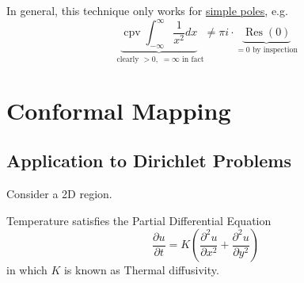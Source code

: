 \documentclass[12pt,titlepage]{article}
\DeclareMathOperator\Res{Res}
\DeclareMathOperator\cpv{cpv}
\let\stdsection\section
\renewcommand\section{\clearpage\stdsection}
\begin{document}
In general, this technique only works for \underline{simple poles}, e.g. $$\underbrace{\cpv \int_{-\infty}^{\infty}\dfrac{1}{x^2}dx}_{\text{ clearly }>0, \; = \infty \text{ in fact}} \neq \pi i \cdot \underbrace{\Res(0)}_{=0 \text{ by inspection}}$$
\section{Conformal Mapping}
\subsection{Application to Dirichlet Problems}
Consider a 2D region. \begin{center}
\end{center}
Temperature satisfies the Partial Differential Equation $$\dfrac{\partial u}{\partial t} = K \left(\dfrac{\partial^2 u}{\partial x^2} + \dfrac{\partial^2 u}{\partial y^2} \right)$$ in which $K$ is known as Thermal diffusivity. 
\end{document}
